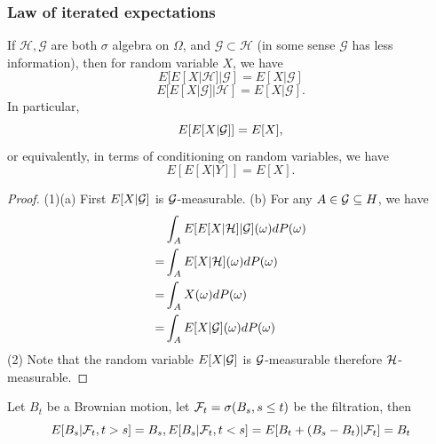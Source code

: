 \begin{refsection}
\subsubsection{Law of iterated expectations}
\begin{lemma}
If $\mathcal{H},\mathcal{G}$ are both $\sigma$ algebra on $\Omega$, and $\mathcal{G}\subset \mathcal{H}$ (in some sense $\mathcal{G}$ has less information), then for random variable $X$, we have $$E[E[X|\mathcal{H}]|\mathcal{G}]=E[X|\mathcal{G}]$$
$$E[E[X|\mathcal{G}]|\mathcal{H}]=E[X|\mathcal{G}].$$
In particular, 
$$E[E[X|\mathcal{G}]] = E[X],$$
or equivalently, 
in terms of conditioning on random variables, we have $$E[E[X|Y]]=E[X].$$
\end{lemma}
\begin{proof}
(1)(a) First  $E[X|\mathcal{G}]$ is $\mathcal{G}$-measurable. (b) For any $A\in \mathcal{G} \subseteq H$, we have
\begin{align*}
&\int_A E[E[X|\mathcal{H}]|\mathcal{G}](\omega)dP(\omega)\\ 
=& \int_A E[X|\mathcal{H}](\omega)dP(\omega)\\
=& \int_A X(\omega)dP(\omega) \\
=& \int_A E[X|\mathcal{G}](\omega)dP(\omega)
\end{align*}
(2) Note that the random variable $E[X|\mathcal{G}]$ is $\mathcal{G}$-measurable therefore $\mathcal{H}$-measurable.
  
\end{proof}


\begin{example}
Let $B_t$ be a Brownian motion, let $\mathcal{F}_t = \sigma(B_s,s\leq t)$ be the filtration, then $$E[B_s|\mathcal{F}_t,t>s]=B_s, E[B_s|\mathcal{F}_t,t<s] = E[B_t+(B_s-B_t)|\mathcal{F}_t] = B_t$$ 
\end{example}


\end{refsection}
